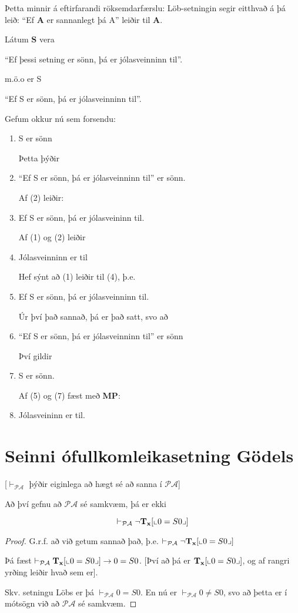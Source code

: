 \documentclass[12pt]{book}
\newcommand{\PA}{\mathcal{PA}}
\newcommand{\bA}{\mathbf{A}}
\newcommand{\bS}{\mathbf{S}}
\newcommand{\bT}{\mathbf{T}}
\newcommand{\bx}{\mathbf{x}}
\newcommand{\vP}{\vdash_{\PA}}
\newcommand{\bTx}{\bT_{\bx}}
\DeclarePairedDelimiter{\pg}{\llcorner}{\lrcorner}
\begin{document}
\begin{ath}
  Þetta minnir á eftirfarandi röksemdarfærslu:
  Löb-setningin segir eitthvað á þá leið:
  ``Ef $\bA$ er sannanlegt þá A'' leiðir til $\bA$.

  Látum $\bS$ vera

  ``Ef þessi setning er sönn, þá er jólasveinninn til''.

  m.ö.o er S

  ``Ef S er sönn, þá er jólasveinninn til''.

  Gefum okkur nú sem forsendu:

  \begin{enumerate}[(1)]
  \item  S er sönn

    Þetta þýðir 


  \item ``Ef S er sönn, þá er jólasveinninn til'' er sönn.

    Af (2) leiðir:

  \item Ef S er sönn, þá er jólasveininn til.

    Af (1) og (2) leiðir
  \item  Jólasveinninn er til

   Hef sýnt að  (1) leiðir til (4), þ.e.

 \item Ef S er sönn, þá er jólasveinninn til.

   Úr því það sannað, þá er það satt, svo að
 \item  ``Ef S er sönn, þá er jólasveinninn til'' er sönn

   Því gildir
 \item S er sönn.

 Af (5) og (7) fæst með \textbf{MP}:
 \item  Jólasveininn er til.
  \end{enumerate}
\end{ath}



\section{Seinni ófullkomleikasetning Gödels}

[$\vP$ þýðir eiginlega að hægt sé að sanna í $\PA$]


\begin{setn}
  Að því gefnu að $\PA$ sé samkvæm, þá er ekki

  \[\vP \lnot \bTx[\pg{0 = S0}]\]
\end{setn}
\begin{proof}
G.r.f. að við getum sannað það, þ.e.
$\vP \lnot \bTx[\pg{0 = S0}]$

Þá fæst $\vP \bTx[\pg{0 = S0}] \to 0 = S0$. [Því að þá er $\bTx[\pg{0 = S0}]$,
og af rangri yrðing leiðir hvað sem er].

Skv. setningu Löbs er þá $\vP 0 = S0$. En 
nú er $\vP 0 \neq S0$, svo að þetta er í mótsögn
við að $\PA$ sé samkvæm.
  
\end{proof}
\end{document}
